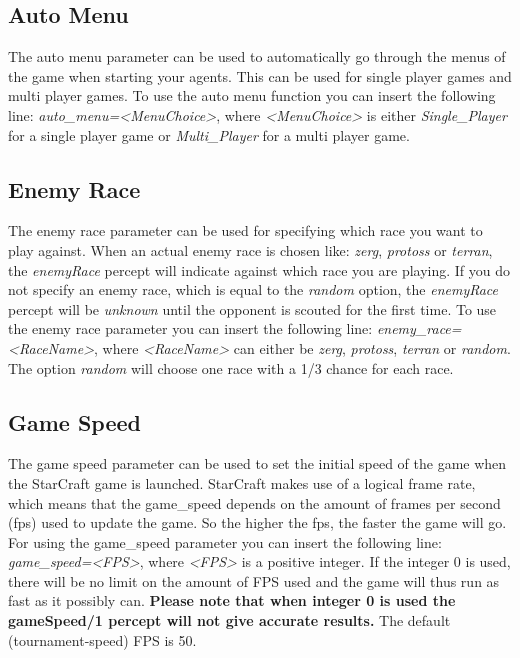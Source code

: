 \subsection{Auto Menu}
\label{auto menu}
The auto menu parameter can be used to automatically go through the menus of the game when starting your agents. This can be used for single player games and multi player games. To use the auto menu function you can insert the following line: \textit{auto\_menu=<MenuChoice>}, where \textit{<MenuChoice>} is either \textit{Single\_Player} for a single player game or \textit{Multi\_Player} for a multi player game.

\subsection{Enemy Race}
\label{enemy race}
The enemy race parameter can be used for specifying which race you want to play against. When an actual enemy race is chosen like: \textit{zerg}, \textit{protoss} or \textit{terran}, the \textit{enemyRace} percept will indicate against which race you are playing. If you do not specify an enemy race, which is equal to the \textit{random} option, the \textit{enemyRace} percept will be \textit{unknown} until the opponent is scouted for the first time. To use the enemy race parameter you can insert the following line: \textit{enemy\_race=<RaceName>}, where \textit{<RaceName>} can either be \textit{zerg}, \textit{protoss}, \textit{terran} or \textit{random}. The option \textit{random} will choose one race with a 1/3 chance for each race.

\subsection{Game Speed}
\label{game speed}
The game speed parameter can be used to set the initial speed of the game when the StarCraft game is launched. StarCraft makes use of a logical frame rate, which means that the game\_speed depends on the amount of frames per second (fps) used to update the game. So the higher the fps, the faster the game will go. For using the game\_speed parameter you can insert the following line: \textit{game\_speed=<FPS>}, where \textit{<FPS>} is a positive integer. If the integer 0 is used, there will be no limit on the amount of FPS used and the game will thus run as fast as it possibly can. \textbf{Please note that when integer 0 is used the gameSpeed/1 percept will not give accurate results.} The default (tournament-speed) FPS is 50.

